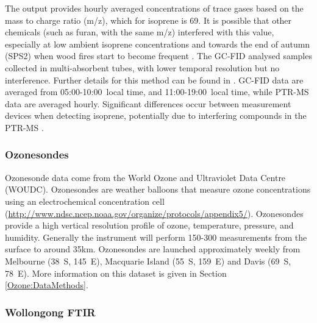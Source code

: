       The output provides hourly averaged concentrations of trace gases based on the mass to charge ratio (m/z), which for isoprene is 69.
      It is possible that other chemicals (such as furan, with the same m/z) interfered with this value, especially at low ambient isoprene concentrations and towards the end of autumn (SPS2) when wood fires start to become frequent \parencite{Guerette2018}.
      The GC-FID analysed samples collected in multi-absorbent tubes, with lower temporal resolution but no interference. 
      Further details for this method can be found in \textcite{Cheng2016}.
      GC-FID data are averaged from 05:00-10:00~local time, and 11:00-19:00~local time, while PTR-MS data are averaged hourly.
      Significant differences occur between measurement devices when detecting isoprene, potentially due to interfering compounds in the PTR-MS \parencite{Dunne2018}.
      
      
    \subsubsection{Ozonesondes}
    \label{Model:datasets:ozonesondes}
    
      Ozonesonde data come from the World Ozone and Ultraviolet Data Centre (WOUDC).
      Ozonesondes are weather balloons that measure ozone concentrations using an electrochemical concentration cell (\url{http://www.ndsc.ncep.noaa.gov/organize/protocols/appendix5/}).
      Ozonesondes provide a high vertical resolution profile of ozone, temperature, pressure, and humidity.
      Generally the instrument will perform 150-300 measurements from the surface to around 35km.
      Ozonesondes are launched approximately weekly from Melbourne (38\degr ~S, 145\degr ~E), Macquarie Island (55\degr ~S, 159\degr ~E) and Davis (69\degr ~S, 78\degr ~E). 
      More information on this dataset is given in Section \ref{Ozone:DataMethods}.
    
    \subsubsection{Wollongong FTIR}
    \label{Model:datasets:wollongong_ftir}
    
